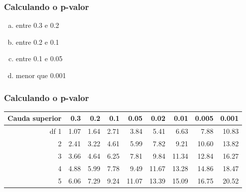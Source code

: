 \begin{frame}
\frametitle{Calculando o p-valor}
\justifying
{}

{
{\small
\begin{enumerate}[(a)]
\setlength{\itemsep}{0in}
\item entre 0.3 e 0.2
\item entre 0.2 e 0.1
\item entre 0.1 e 0.05
\item menor que 0.001
\end{enumerate}
}
}
\end{frame}

\begin{frame}
\frametitle{Calculando o p-valor}

\begin{center}
{\scriptsize
\begin{tabular}{r | rrrr | rrrr |}
  \hline
Cauda superior & 0.3 & 0.2 & 0.1 & 0.05 & 0.02 & 0.01 & 0.005 & 0.001 \\ 
  \hline
df \hfill 1 &  1.07 &  1.64 &  2.71 &  3.84 &  5.41 &  6.63 &  7.88 &  10.83 \\ 
  2 &  2.41 &  3.22 &  4.61 &  5.99 &  7.82 &  9.21 &  10.60 &  13.82 \\ 
  3 &  3.66 &  4.64 &  6.25 &  7.81 &  9.84 &  11.34 &  12.84 &  16.27 \\ 
  4 &  4.88 &  5.99 &  7.78 &  9.49 &  11.67 &  13.28 &  14.86 &  18.47 \\ 
  5 &  6.06 &  7.29 &  9.24 &  11.07 &  13.39 &  15.09 &  16.75 &  20.52 \\ 
\end{tabular}
}
\end{center}

\end{frame}

